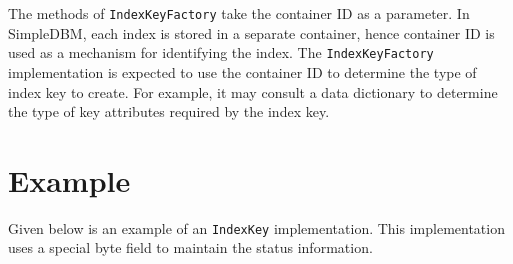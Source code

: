 \documentclass[a4paper,draft,oneside]{book}
\begin{document}
The methods of \verb|IndexKeyFactory| take the container ID as
a parameter. In SimpleDBM, each index is stored in a separate container,
hence container ID is used as a mechanism for identifying the index.
The \verb|IndexKeyFactory| implementation is expected to use the
container ID to determine the type of index key to create. For example, it may
consult a data dictionary to determine the type of key attributes required
by the index key.

\section{Example}

Given below is an example of an \verb|IndexKey| implementation. This 
implementation uses a special byte field to maintain the status information.
\end{document}

